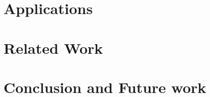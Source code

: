 \documentclass[11pt]{ucthesis}
\begin{document}
\chapter{Applications}
\label{chapter:app}



\chapter{Related Work}
\label{chapter:related}


\chapter{Conclusion and Future work}
\label{chapter:summary}


%


  

\end{document}
